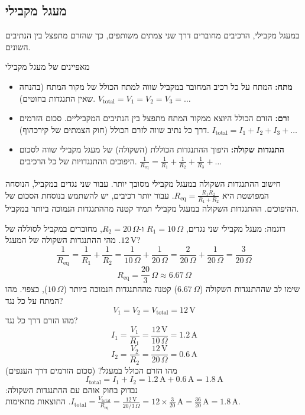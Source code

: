 \documentclass[12pt]{article}
\begin{document}
\subsection{מעגל מקבילי}
במעגל מקבילי, הרכיבים מחוברים דרך שני צמתים משותפים, כך שהזרם מתפצל בין הנתיבים השונים.

\begin{remarkBox}{מאפיינים של מעגל מקבילי}
\begin{itemize}
    \item \textbf{מתח:} המתח על כל רכיב המחובר במקביל שווה למתח הכולל של מקור המתח (בהנחה שאין התנגדות בחוטים). \(V_{\text{total}} = V_1 = V_2 = V_3 = \dots\)
    \item \textbf{זרם:} הזרם הכולל היוצא ממקור המתח מתפצל בין הנתיבים המקביליים. סכום הזרמים דרך כל נתיב שווה לזרם הכולל (חוק הצמתים של קירכהוף). \(I_{\text{total}} = I_1 + I_2 + I_3 + \dots\)
    \item \textbf{התנגדות שקולה:} היפוך ההתנגדות הכוללת (השקולה) של מעגל מקבילי שווה לסכום היפוכים ההתנגדויות של כל הרכיבים. \(\frac{1}{R_{\text{eq}}} = \frac{1}{R_1} + \frac{1}{R_2} + \frac{1}{R_3} + \dots\)
\end{itemize}
\end{remarkBox}

חישוב ההתנגדות השקולה במעגל מקבילי מסובך יותר. עבור שני נגדים במקביל, הנוסחה המפושטת היא \(R_{\text{eq}} = \frac{R_1 R_2}{R_1 + R_2}\). עבור יותר רכיבים, יש להשתמש בנוסחת הסכום של ההיפוכים. ההתנגדות השקולה במעגל מקבילי תמיד קטנה מההתנגדות הנמוכה ביותר במקביל.

\begin{exampleBox}{דוגמה: מעגל מקבילי}
שני נגדים, \(R_1 = 10 \, \Omega\) ו-\(R_2 = 20 \, \Omega\), מחוברים במקביל לסוללה של \(12 \, \text{V}\).
מהי ההתנגדות השקולה של המעגל?
\[\frac{1}{R_{\text{eq}}} = \frac{1}{R_1} + \frac{1}{R_2} = \frac{1}{10 \, \Omega} + \frac{1}{20 \, \Omega} = \frac{2}{20 \, \Omega} + \frac{1}{20 \, \Omega} = \frac{3}{20 \, \Omega}\]
\[R_{\text{eq}} = \frac{20}{3} \, \Omega \approx 6.67 \, \Omega\]
שימו לב שההתנגדות השקולה (\(6.67 \, \Omega\)) קטנה מההתנגדות הנמוכה ביותר (\(10 \, \Omega\)), כצפוי.
מהו המתח על כל נגד?
\[V_1 = V_2 = V_{\text{total}} = 12 \, \text{V}\]
מהו הזרם דרך כל נגד?
\[I_1 = \frac{V_1}{R_1} = \frac{12 \, \text{V}}{10 \, \Omega} = 1.2 \, \text{A}\]
\[I_2 = \frac{V_2}{R_2} = \frac{12 \, \text{V}}{20 \, \Omega} = 0.6 \, \text{A}\]
מהו הזרם הכולל במעגל? (סכום הזרמים דרך הענפים)
\[I_{\text{total}} = I_1 + I_2 = 1.2 \, \text{A} + 0.6 \, \text{A} = 1.8 \, \text{A}\]
נבדוק בחוק אוהם עם ההתנגדות השקולה: \(I_{\text{total}} = \frac{V_{\text{total}}}{R_{\text{eq}}} = \frac{12 \, \text{V}}{20/3 \, \Omega} = 12 \times \frac{3}{20} \, \text{A} = \frac{36}{20} \, \text{A} = 1.8 \, \text{A}\). התוצאות מתאימות.
\end{exampleBox}
\end{document}
